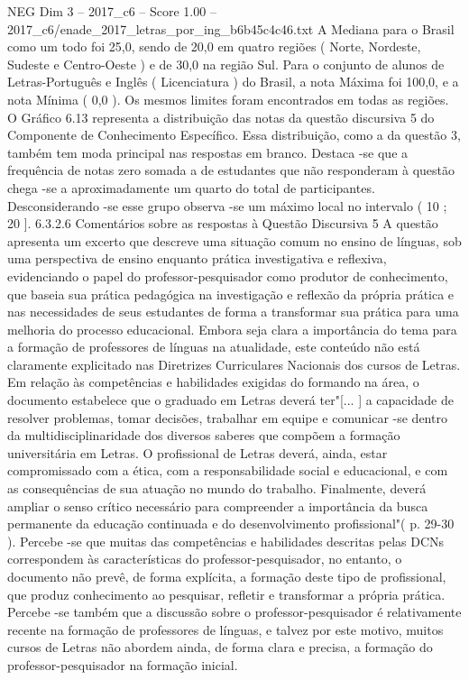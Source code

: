 \begin{textsample}{NEG Dim 3 – 2017\_c6 – Score 1.00 – 2017\_c6/enade\_2017\_letras\_por\_ing\_b6b45c4c46.txt}
A Mediana para o Brasil como um todo foi 25,0, sendo de 20,0 em quatro regiões ( Norte, Nordeste, Sudeste e Centro-Oeste ) e de 30,0 na região Sul.
Para o conjunto de alunos de Letras-Português e Inglês ( Licenciatura ) do Brasil, a nota Máxima foi 100,0, e a nota Mínima ( 0,0 ).
Os mesmos limites foram encontrados em todas as regiões.
O Gráfico 6.13 representa a distribuição das notas da questão discursiva 5 do Componente de Conhecimento Específico.
Essa distribuição, como a da questão 3, também tem moda principal nas respostas em branco.
Destaca -se que a frequência de notas zero somada a de estudantes que não responderam à questão chega -se a aproximadamente um quarto do total de participantes.
Desconsiderando -se esse grupo observa -se um máximo local no intervalo ( 10 ; 20 ]. 6.3.2.6 Comentários sobre as respostas à Questão Discursiva 5 A questão apresenta um excerto que descreve uma situação comum no ensino de línguas, sob uma perspectiva de ensino enquanto prática investigativa e reflexiva, evidenciando o papel do professor-pesquisador como produtor de conhecimento, que baseia sua prática pedagógica na investigação e reflexão da própria prática e nas necessidades de seus estudantes de forma a transformar sua prática para uma melhoria do processo educacional.
Embora seja clara a importância do tema para a formação de professores de línguas na atualidade, este conteúdo não está claramente explicitado nas Diretrizes Curriculares Nacionais dos cursos de Letras.
Em relação às competências e habilidades exigidas do formando na área, o documento estabelece que o graduado em Letras deverá ter"[... ] a capacidade de resolver problemas, tomar decisões, trabalhar em equipe e comunicar -se dentro da multidisciplinaridade dos diversos saberes que compõem a formação universitária em Letras.
O profissional de Letras deverá, ainda, estar compromissado com a ética, com a responsabilidade social e educacional, e com as consequências de sua atuação no mundo do trabalho.
Finalmente, deverá ampliar o senso crítico necessário para compreender a importância da busca permanente da educação continuada e do desenvolvimento profissional"( p. 29-30 ).
Percebe -se que muitas das competências e habilidades descritas pelas DCNs correspondem às características do professor-pesquisador, no entanto, o documento não prevê, de forma explícita, a formação deste tipo de profissional, que produz conhecimento ao pesquisar, refletir e transformar a própria prática.
Percebe -se também que a discussão sobre o professor-pesquisador é relativamente recente na formação de professores de línguas, e talvez por este motivo, muitos cursos de Letras não abordem ainda, de forma clara e precisa, a formação do professor-pesquisador na formação inicial.

\end{textsample}
